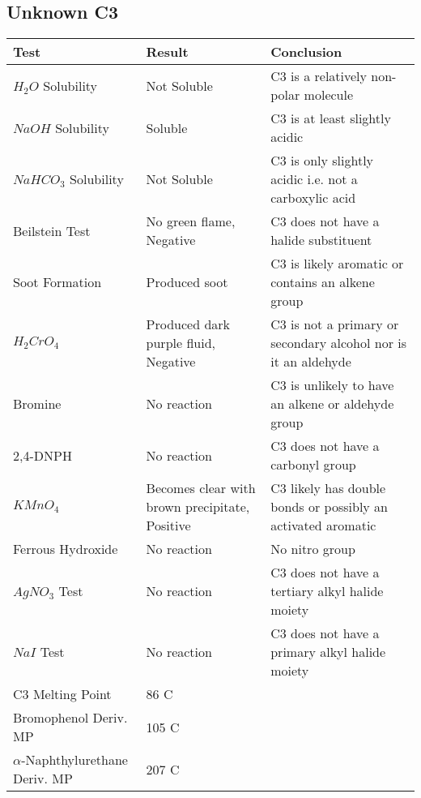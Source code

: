 \documentclass{article}
\begin{document}
	\subsection{Unknown C3}
	\begin{table}[h]
		\raggedright
		\begin{tabular}{ l  p{3.0cm} p{5.4cm} } 
			\toprule
			\textbf{Test} & \textbf{Result} & \textbf{Conclusion} \\\midrule
			
			$H_2O$ Solubility & Not Soluble & C3 is a relatively non-polar molecule \\\hline
			
			$NaOH$ Solubility & Soluble & C3 is at least slightly acidic \\\hline
			
			$NaHCO_3$ Solubility & Not Soluble & C3 is only slightly acidic i.e. not a carboxylic acid\\\hline
			
			Beilstein Test & No green flame, Negative & C3 does not have a halide substituent \\\hline
			
			Soot Formation & Produced soot & C3 is likely aromatic or contains an alkene group \\\hline
			
			$H_2CrO_4$ & Produced dark purple fluid, Negative & C3 is not a primary or secondary alcohol nor is it an aldehyde \\\hline
			
			Bromine & No reaction & C3 is unlikely to have an alkene or aldehyde group \\\hline 
			
			2,4-DNPH & No reaction & C3 does not have a carbonyl group \\\hline 
			
			$KMnO_4$ & Becomes clear with brown precipitate, Positive & C3 likely has double bonds or possibly an activated aromatic \\\hline  
			
			Ferrous Hydroxide & No reaction & No nitro group \\\hline
			
			$AgNO_3$ Test & No reaction & C3 does not have a tertiary alkyl halide moiety \\\hline 
			
			$NaI$ Test & No reaction & C3 does not have a primary alkyl halide moiety \\\hline 
			
			C3 Melting Point & 86 C &  \\\hline
			
			Bromophenol Deriv. MP & 105 C &  \\\hline
			
			$\alpha$-Naphthylurethane Deriv. MP & 207 C &  \\\hline
			
		\end{tabular}
	\end{table}
	\pagebreak
\end{document}
